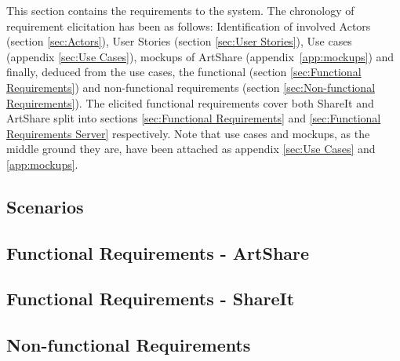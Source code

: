 \documentclass{report}
\begin{document}



This section contains the requirements to the system. The chronology of requirement elicitation has been as follows: Identification of involved Actors (section \ref{sec:Actors}), User Stories (section \ref{sec:User Stories}), Use cases (appendix \ref{sec:Use Cases}), mockups of ArtShare (appendix~\ref{app:mockups}) and finally, deduced from the use cases, the functional (section \ref{sec:Functional Requirements}) and non-functional requirements (section \ref{sec:Non-functional Requirements}). The elicited functional requirements cover both ShareIt and ArtShare split into sections \ref{sec:Functional Requirements} and \ref{sec:Functional Requirements Server} respectively. Note that use cases and mockups, as the middle ground they are, have been attached as appendix \ref{sec:Use Cases} and \ref{app:mockups}.


\subsection{Scenarios}







\FloatBarrier
\newpage \subsection{Functional Requirements - ArtShare}


\newpage \subsection{Functional Requirements - ShareIt}


\newpage \subsection{Non-functional Requirements}

\end{document}
